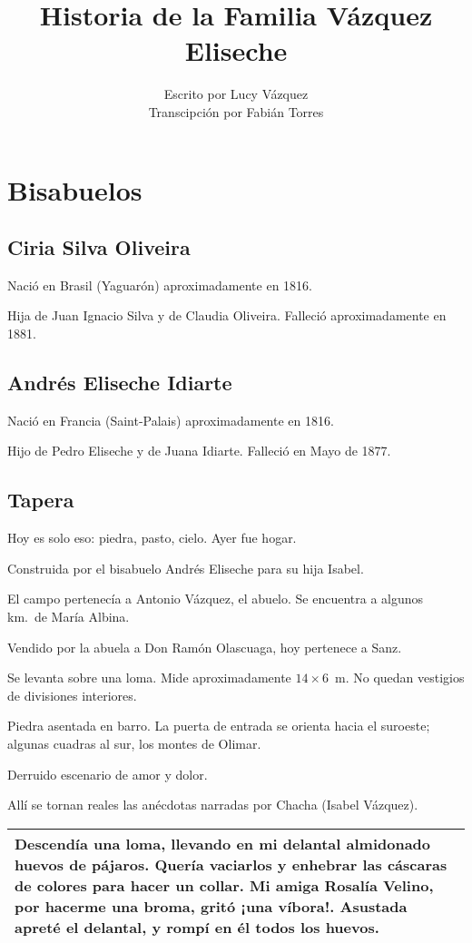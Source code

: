 \documentclass[a4paper]{article}
\title{Historia de la Familia Vázquez Eliseche}
\author{Escrito por Lucy Vázquez\\ Transcipción por Fabián Torres}
\date{}
\begin{document}
\maketitle
\newpage
\tableofcontents
\newpage

\section{Bisabuelos}

\subsection{Ciria Silva Oliveira}

Nació en Brasil (Yaguarón) aproximadamente en 1816.

Hija de Juan Ignacio Silva y de Claudia Oliveira. Falleció aproximadamente en 1881.

\subsection{Andrés Eliseche Idiarte}

Nació en Francia (Saint-Palais) aproximadamente en 1816.

Hijo de Pedro Eliseche y de Juana Idiarte. Falleció en Mayo de 1877.

\subsection{Tapera}

Hoy es solo eso: piedra, pasto, cielo. Ayer fue hogar.

Construida por el bisabuelo Andrés Eliseche para su hija Isabel.

El campo pertenecía a Antonio Vázquez, el abuelo. Se encuentra a algunos km.\ de María Albina.

Vendido por la abuela a Don Ramón Olascuaga, hoy pertenece a Sanz.

Se levanta sobre una loma. Mide aproximadamente $14\times6$~m. No quedan vestigios de divisiones interiores.

Piedra asentada en barro. La puerta de entrada se orienta hacia el suroeste; algunas cuadras al sur, los montes de Olimar.

Derruido escenario de amor y dolor.

Allí se tornan reales las anécdotas narradas por Chacha (Isabel Vázquez).

\begin{table}[htb]
    \centering
    \begin{tabular}{|p{10cm}|}
    \bottomrule
    Descendía una loma, llevando en mi delantal almidonado huevos de pájaros. Quería vaciarlos y enhebrar las cáscaras de colores para hacer un collar. Mi amiga Rosalía Velino, por hacerme una broma, gritó ¡una víbora!. Asustada apreté el delantal, y rompí en él todos los huevos.\\
    \toprule
    \end{tabular}
\end{table}
\end{document}

